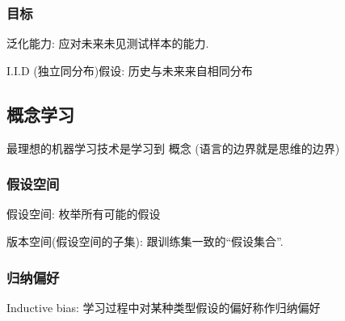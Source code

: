 \subsubsection{目标}
泛化能力: 应对未来未见测试样本的能力. 

I.I.D (独立同分布)假设: 历史与未来来自相同分布

\subsection{概念学习}
最理想的机器学习技术是学习到 概念 (语言的边界就是思维的边界)
\subsubsection{假设空间}
假设空间: 枚举所有可能的假设

版本空间(假设空间的子集): 跟训练集一致的``假设集合''. 

\subsubsection{归纳偏好}
Inductive bias: 学习过程中对某种类型假设的偏好称作归纳偏好

